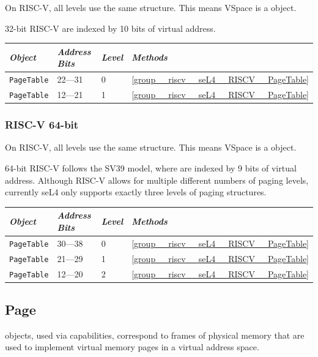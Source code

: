 On RISC-V, all levels use the same structure. This means VSpace is a  object.

32-bit RISC-V  are indexed by 10 bits of virtual address.

\begin{tabularx}{\textwidth}{Xlll} \toprule
\emph{Object}          & \emph{Address Bits} & \emph{Level} & \emph{Methods} \\ \midrule
\texttt{PageTable}     & 22---31             & 0            & \autoref{group__riscv__seL4__RISCV__PageTable} \\
\texttt{PageTable}     & 12---21             & 1            & \autoref{group__riscv__seL4__RISCV__PageTable} \\
\bottomrule
\end{tabularx}

\subsubsection{RISC-V 64-bit}

On RISC-V, all levels use the same structure. This means VSpace is a  object.

64-bit RISC-V follows the SV39 model, where  are indexed by 9 bits of virtual address.
Although RISC-V allows
for multiple different numbers of paging levels, currently seL4 only supports exactly three levels
of paging structures.

\begin{tabularx}{\textwidth}{Xlll} \toprule
\emph{Object}          & \emph{Address Bits} & \emph{Level} & \emph{Methods} \\ \midrule
\texttt{PageTable}     & 30---38             & 0            & \autoref{group__riscv__seL4__RISCV__PageTable} \\
\texttt{PageTable}     & 21---29             & 1            & \autoref{group__riscv__seL4__RISCV__PageTable} \\
\texttt{PageTable}     & 12---20             & 2            & \autoref{group__riscv__seL4__RISCV__PageTable} \\
\bottomrule
\end{tabularx}

\subsection{Page}

 objects, used via  capabilities, correspond to frames of physical memory that
are used to implement virtual memory pages in a virtual address space.

